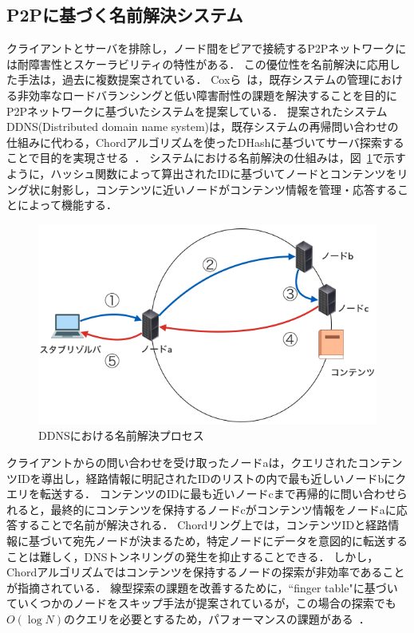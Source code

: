 \subsection{P2Pに基づく名前解決システム}
クライアントとサーバを排除し，ノード間をピアで接続するP2Pネットワークには耐障害性とスケーラビリティの特性がある．
この優位性を名前解決に応用した手法は，過去に複数提案されている．
Coxら~\cite{cox}は，既存システムの管理における非効率なロードバランシングと低い障害耐性の課題を解決することを目的にP2Pネットワークに基づいたシステムを提案している．
提案されたシステムDDNS(Distributed domain name system)は，既存システムの再帰問い合わせの仕組みに代わる，Chordアルゴリズムを使ったDHashに基づいてサーバ探索することで目的を実現させる~\cite{dhash}．
システムにおける名前解決の仕組みは，図~\ref{fig:chord}で示すように，ハッシュ関数によって算出されたIDに基づいてノードとコンテンツをリング状に射影し，コンテンツに近いノードがコンテンツ情報を管理・応答することによって機能する．
\begin{figure}[bhtp]
 \centering
 \includegraphics[scale=0.4]{figure/chord-mechanism.png}
 \caption{DDNSにおける名前解決プロセス}
 \label{fig:chord}
\end{figure}
クライアントからの問い合わせを受け取ったノードaは，クエリされたコンテンツIDを導出し，経路情報に明記されたIDのリストの内で最も近しいノードbにクエリを転送する．
コンテンツのIDに最も近いノードcまで再帰的に問い合わせられると，最終的にコンテンツを保持するノードcがコンテンツ情報をノードaに応答することで名前が解決される．
Chordリング上では，コンテンツIDと経路情報に基づいて宛先ノードが決まるため，特定ノードにデータを意図的に転送することは難しく，DNSトンネリングの発生を抑止することできる．
しかし，Chordアルゴリズムではコンテンツを保持するノードの探索が非効率であることが指摘されている．
線型探索の課題を改善するために，``finger table"に基づいていくつかのノードをスキップ手法が提案されているが，この場合の探索でも$O(\log N)$のクエリを必要とするため，パフォーマンスの課題がある~\cite{p_donas}．

